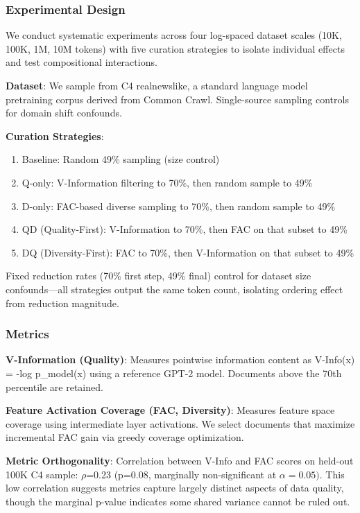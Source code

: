 
\subsubsection{Experimental Design}

We conduct systematic experiments across four log-spaced dataset scales (10K, 100K, 1M, 10M tokens) with five curation strategies to isolate individual effects and test compositional interactions.

\textbf{Dataset}: We sample from C4 realnewslike, a standard language model pretraining corpus derived from Common Crawl. Single-source sampling controls for domain shift confounds.

\textbf{Curation Strategies}:
\begin{enumerate}
\item Baseline: Random 49\% sampling (size control)
\item Q-only: V-Information filtering to 70\%, then random sample to 49\%
\item D-only: FAC-based diverse sampling to 70\%, then random sample to 49\%
\item QD (Quality-First): V-Information to 70\%, then FAC on that subset to 49\%
\item DQ (Diversity-First): FAC to 70\%, then V-Information on that subset to 49\%
\end{enumerate}

Fixed reduction rates (70\% first step, 49\% final) control for dataset size confounds---all strategies output the same token count, isolating ordering effect from reduction magnitude.

\subsubsection{Metrics}

\textbf{V-Information (Quality)}: Measures pointwise information content as V-Info(x) = -log p\_model(x) using a reference GPT-2 model. Documents above the 70th percentile are retained.

\textbf{Feature Activation Coverage (FAC, Diversity)}: Measures feature space coverage using intermediate layer activations. We select documents that maximize incremental FAC gain via greedy coverage optimization.

\textbf{Metric Orthogonality}: Correlation between V-Info and FAC scores on held-out 100K C4 sample: $\rho$=0.23 (p=0.08, marginally non-significant at $\alpha =0.05)$. This low correlation suggests metrics capture largely distinct aspects of data quality, though the marginal p-value indicates some shared variance cannot be ruled out.

